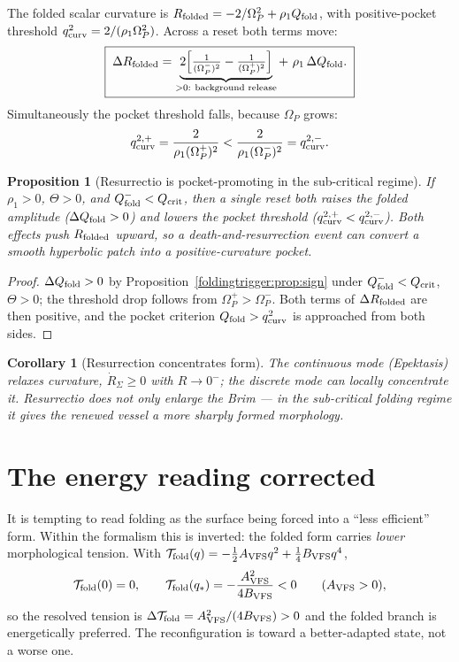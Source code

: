 \documentclass[11pt,a4paper,oneside]{book}
\newcommand{\Op}{\Omega_P}
\newcommand{\Avfs}{A_{\rm VFS}}
\newcommand{\Bvfs}{B_{\rm VFS}}
\newcommand{\Qf}{Q_{\rm fold}}
\newcommand{\Tfold}{\mathcal{T}_{\rm fold}}
\theoremstyle{plain}
\newtheorem{proposition}{Proposition}[chapter]
\newtheorem{corollary}{Corollary}[chapter]
\theoremstyle{definition}
\theoremstyle{remark}
\begin{document}
The folded scalar curvature is $R_{\rm folded}=-2/\Op^2+\rho_1\Qf$, with positive-pocket threshold
$q_{\rm curv}^2=2/(\rho_1\Op^2)$. Across a reset both terms move:
\begin{equation}
\boxed{\;\Delta R_{\rm folded}
=\underbrace{2\Bigl[\tfrac{1}{(\Op^-)^2}-\tfrac{1}{(\Op^+)^2}\Bigr]}_{>0:\ \text{background release}}
+\ \rho_1\,\Delta\Qf.\;}
\end{equation}
Simultaneously the pocket threshold falls, because $\Op$ grows:
\begin{equation}
q_{\rm curv}^{2,+}=\frac{2}{\rho_1(\Op^+)^2}<\frac{2}{\rho_1(\Op^-)^2}=q_{\rm curv}^{2,-}.
\end{equation}

\begin{proposition}[Resurrectio is pocket-promoting in the sub-critical regime]\label{foldingtrigger:prop:pocket}
If $\rho_1>0$, $\Theta>0$, and $\Qf^{-}<Q_{\rm crit}$, then a single reset both raises the folded amplitude
($\Delta\Qf>0$) and lowers the pocket threshold ($q_{\rm curv}^{2,+}<q_{\rm curv}^{2,-}$). Both effects push
$R_{\rm folded}$ upward, so a death-and-resurrection event can convert a smooth hyperbolic patch into a
positive-curvature pocket.
\end{proposition}
\begin{proof}
$\Delta\Qf>0$ by Proposition~\ref{foldingtrigger:prop:sign} under $\Qf^{-}<Q_{\rm crit}$, $\Theta>0$; the threshold drop
follows from $\Op^+>\Op^-$. Both terms of $\Delta R_{\rm folded}$ are then positive, and the pocket
criterion $\Qf>q_{\rm curv}^2$ is approached from both sides.
\end{proof}

\begin{corollary}[Resurrection concentrates form]
The continuous mode (Epektasis) relaxes curvature, $\dot R_\Sigma\ge0$ with $R\to0^-$; the discrete mode
can locally \emph{concentrate} it. Resurrectio does not only enlarge the Brim --- in the sub-critical
folding regime it gives the renewed vessel a more sharply formed morphology.
\end{corollary}

\section{The energy reading corrected}\label{foldingtrigger:sec:energy}

It is tempting to read folding as the surface being forced into a ``less efficient'' form. Within the
formalism this is inverted: the folded form carries \emph{lower} morphological tension. With
$\Tfold(q)=-\tfrac12\Avfs q^2+\tfrac14\Bvfs q^4$,
\begin{equation}
\Tfold(0)=0,
\qquad
\Tfold(q_\ast)=-\frac{\Avfs^2}{4\Bvfs}<0
\qquad(\Avfs>0),
\end{equation}
so the resolved tension is $\Delta\Tfold=\Avfs^2/(4\Bvfs)>0$ and the folded branch is energetically
preferred. The reconfiguration is toward a better-adapted state, not a worse one.
\end{document}
